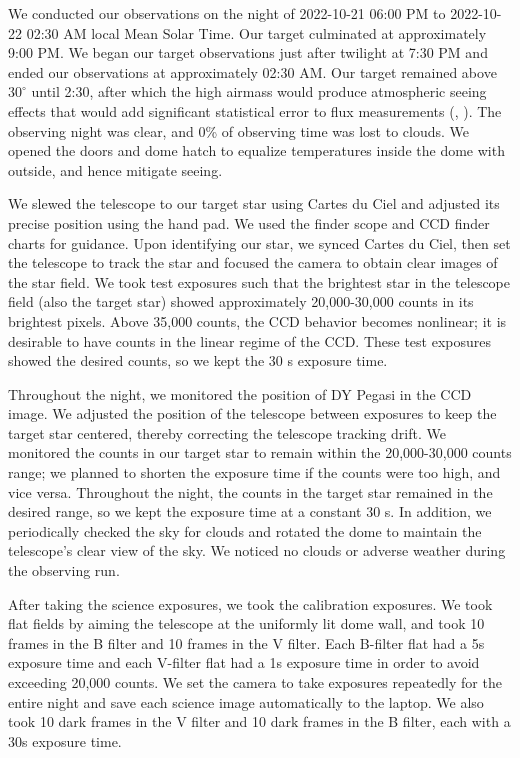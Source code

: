 \documentclass[twocolumn]{aastex631}
\newcommand{\degree}{^\circ}
\begin{document}
We conducted our observations on the night of 2022-10-21 06:00 PM to 2022-10-22 02:30 AM local Mean Solar Time. Our target culminated at approximately 9:00 PM. We began our target observations just after twilight at 7:30 PM and ended our observations at approximately 02:30 AM. Our target remained above $30\degree$ until 2:30, after which the high airmass would produce atmospheric seeing effects that would add significant statistical error to flux measurements (\citet{vdl_2022_4}, \citet{vdl_2022}). The observing night was clear, and 0\% of observing time was lost to clouds. We opened the doors and dome hatch to equalize temperatures inside the dome with outside, and hence mitigate seeing. \citep{vdl_2022_2}

We slewed the telescope to our target star using Cartes du Ciel and adjusted its precise position using the hand pad. We used the finder scope and CCD finder charts for guidance. Upon identifying our star, we synced Cartes du Ciel, then set the telescope to track the star and focused the camera to obtain clear images of the star field. We took test exposures such that the brightest star in the telescope field (also the target star) showed approximately 20,000-30,000 counts in its brightest pixels. Above 35,000 counts, the CCD behavior becomes nonlinear; it is desirable to have counts in the linear regime of the CCD. These test exposures showed the desired counts, so we kept the 30 s exposure time.

Throughout the night, we monitored the position of DY Pegasi in the CCD image. We adjusted the position of the telescope between exposures to keep the target star centered, thereby correcting the telescope tracking drift. We monitored the counts in our target star to remain within the 20,000-30,000 counts range; we planned to shorten the exposure time if the counts were too high, and vice versa. Throughout the night, the counts in the target star remained in the desired range, so we kept the exposure time at a constant 30 s. In addition, we periodically checked the sky for clouds and rotated the dome to maintain the telescope's clear view of the sky. We noticed no clouds or adverse weather during the observing run.

After taking the science exposures, we took the calibration exposures. We took flat fields by aiming the telescope at the uniformly lit dome wall, and took 10 frames in the B filter and 10 frames in the V filter. Each B-filter flat had a 5s exposure time and each V-filter flat had a 1s exposure time in order to avoid exceeding 20,000 counts. We set the camera to take exposures repeatedly for the entire night and save each science image automatically to the laptop. We also took 10 dark frames in the V filter and 10 dark frames in the B filter, each with a 30s exposure time.
\end{document}
